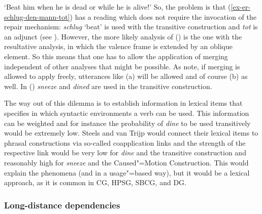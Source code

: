 \glt `Beat him when he is dead or while he is alive!'
\z
So, the problem is that (\ref{ex-er-schlug-den-mann-tot}) has a reading which does not require the invocation of the repair mechanism: \emph{schlug} `beat' is used with the transitive
construction and \emph{tot} is an adjunct (see \citealp{Winkler97a}). However, the more likely analysis of () is the one
with the resultative analysis, in which the valence frame is extended by an oblique element. So this
means that one has to allow the application of merging independent of other analyses that might be possible.
As \citet[]{SvT2011a} note, if merging is allowed to apply freely, utterances like
(a) will be allowed and of course (b) as well.
\eal
{}
\zl
In () \emph{sneeze} and \emph{dined} are used in the transitive construction.

The way out of this dilemma is to establish information in lexical items that specifies in which
syntactic environments a verb can be used. This information can be weighted and for instance the
probability of \emph{dine} to be used transitively would be extremely low. Steels and van Trijp
would connect their lexical items to phrasal constructions via so-called coapplication links and the
strength of the respective link would be very low for \emph{dine} and the transitive construction and
reasonably high for \emph{sneeze} and the Caused"=Motion Construction. This would explain the
phenomena (and in a usage"=based way), but it would be a lexical approach, as it is common in CG, HPSG,
SBCG, and DG.

\subsubsection{Long-distance dependencies}
\label{sec-fcg-nld}

